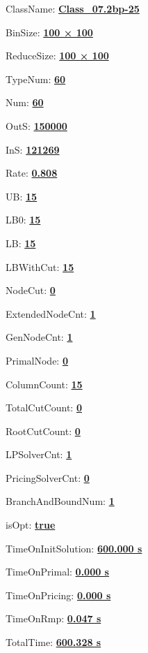 \documentclass[11pt]{article}
\begin{document}
\pagestyle{empty}


ClassName: \underline{\textbf{Class_07.2bp-25}}
\par
BinSize: \underline{\textbf{100 × 100}}
\par
ReduceSize: \underline{\textbf{100 × 100}}
\par
TypeNum: \underline{\textbf{60}}
\par
Num: \underline{\textbf{60}}
\par
OutS: \underline{\textbf{150000}}
\par
InS: \underline{\textbf{121269}}
\par
Rate: \underline{\textbf{0.808}}
\par
UB: \underline{\textbf{15}}
\par
LB0: \underline{\textbf{15}}
\par
LB: \underline{\textbf{15}}
\par
LBWithCut: \underline{\textbf{15}}
\par
NodeCut: \underline{\textbf{0}}
\par
ExtendedNodeCnt: \underline{\textbf{1}}
\par
GenNodeCnt: \underline{\textbf{1}}
\par
PrimalNode: \underline{\textbf{0}}
\par
ColumnCount: \underline{\textbf{15}}
\par
TotalCutCount: \underline{\textbf{0}}
\par
RootCutCount: \underline{\textbf{0}}
\par
LPSolverCnt: \underline{\textbf{1}}
\par
PricingSolverCnt: \underline{\textbf{0}}
\par
BranchAndBoundNum: \underline{\textbf{1}}
\par
isOpt: \underline{\textbf{true}}
\par
TimeOnInitSolution: \underline{\textbf{600.000 s}}
\par
TimeOnPrimal: \underline{\textbf{0.000 s}}
\par
TimeOnPricing: \underline{\textbf{0.000 s}}
\par
TimeOnRmp: \underline{\textbf{0.047 s}}
\par
TotalTime: \underline{\textbf{600.328 s}}
\par
\newpage


\end{document}
